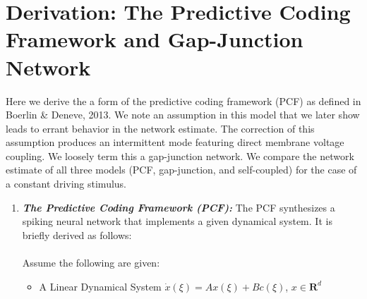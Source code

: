 \section{Derivation: The Predictive Coding Framework and Gap-Junction Network}


Here we derive the a form of the predictive coding framework (PCF) as defined in Boerlin \& Deneve, 2013. We note an assumption in this model that we later show leads to errant behavior in the network estimate. The correction of this assumption produces an intermittent mode featuring direct membrane voltage coupling. We loosely term this a gap-junction network. We compare the network estimate of all three models (PCF, gap-junction, and self-coupled) for the case of a constant driving stimulus. 

\begin{enumerate}

\item \textbf{\textit{The Predictive Coding Framework (PCF):}} The PCF synthesizes a spiking neural network that implements a given dynamical system. It is briefly derived as follows:\\
\\
Assume the following are given:
\begin{itemize}
    \item A Linear Dynamical System  $\dot{x}(\xi) = A x(\xi) + B c(\xi)$,  $x \in \mathbf{R}^d$
    

\end{itemize}
\end{enumerate}
